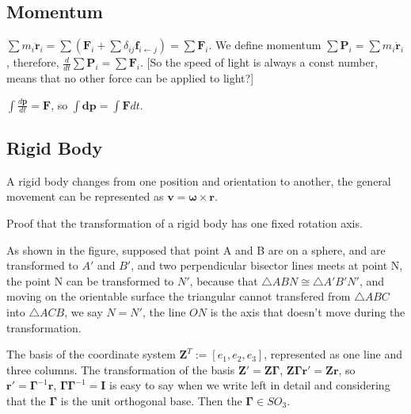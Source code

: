 \documentclass[UTF8]{../06-Physics}
\begin{document}
\subsection{Momentum}

$\sum m_i \boldsymbol {\ddot{r}}_i= \sum ({\boldsymbol F}_i + \sum \delta_{ij}\boldsymbol{f}_{i \leftarrow j})  = \sum \boldsymbol F_i $. We define momentum $\sum \boldsymbol{P}_i  =  \sum m_i \boldsymbol {\dot{r}}_i$, therefore, $\frac{d}{dt} \sum \boldsymbol{P}_i  = \sum {\boldsymbol F}_i$. [So the speed of light is always a const number, means that no other force can be applied to light?]

$\int \frac{d \boldsymbol{p}}{dt} = \boldsymbol{F}$, so $\int \boldsymbol{dp} = \int \boldsymbol F dt$.

\subsection{Rigid Body}
A rigid body changes from one position and orientation to another, the general movement can be represented as $\boldsymbol{v} = \boldsymbol \omega  \times \boldsymbol{r} $. 



\begin{proposition}

Proof that the transformation of a rigid body has one fixed rotation axis. 

As shown in the figure, supposed that point A and B are on a sphere, and are transformed to $A'$ and $B'$, and two perpendicular bisector lines meets at point N, the point N can be transformed to $N'$, because that $\bigtriangleup ABN \cong  \bigtriangleup A'B'N'$, and moving on the orientable surface the triangular cannot transfered from $\bigtriangleup ABC$ into $\bigtriangleup ACB$, we say $N = N'$, the line $ON$ is the axis that doesn't move during the transformation.
    
The basis of the coordinate system $\boldsymbol{Z}^T := [e_1,e_2,e_3]$, represented as one line and three columns. The transformation of the basis $\boldsymbol{Z}' = \boldsymbol Z \boldsymbol{\Gamma }$, $\boldsymbol Z \boldsymbol{\Gamma } \boldsymbol{r}' =\boldsymbol Z \boldsymbol r $, so $ \boldsymbol{r}' = \boldsymbol{\Gamma } ^{-1}\boldsymbol{r}$, $\boldsymbol{\Gamma } \boldsymbol{\Gamma } ^{-1} = \boldsymbol{I}$ is easy to say when we write left in detail and considering that the $\boldsymbol{\Gamma }$ is the unit orthogonal base. Then the $\boldsymbol{\Gamma } \in SO_3$.
\end{proposition}
\end{document}
